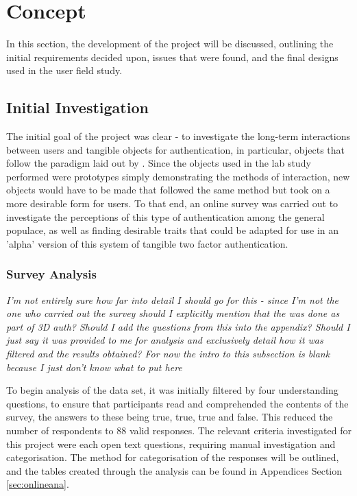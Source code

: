 \documentclass{l4proj}
\begin{document}
\chapter{Concept}

In this section, the development of the project will be discussed, outlining the initial requirements decided upon, issues that were found, and the final designs used in the user field study.

\section{Initial Investigation}

The initial goal of the project was clear - to investigate the long-term interactions between users and tangible objects for authentication, in particular, objects that follow the paradigm laid out by \cite{marky20203d}. Since the objects used in the lab study performed were prototypes simply demonstrating the methods of interaction, new objects would have to be made that followed the same method but took on a more desirable form for users. To that end, an online survey was carried out to investigate the perceptions of this type of authentication among the general populace, as well as finding desirable traits that could be adapted for use in an 'alpha' version of this system of tangible two factor authentication.

\subsection{Survey Analysis}

\textit{I'm not entirely sure how far into detail I should go for this - since I'm not the one who carried out the survey should I explicitly mention that the was done as part of 3D auth? Should I add the questions from this into the appendix? Should I just say it was provided to me for analysis and exclusively detail how it was filtered and the results obtained? For now the intro to this subsection is blank because I just don't know what to put here}

To begin analysis of the data set, it was initially filtered by four understanding questions, to ensure that participants read and comprehended the contents of the survey, the answers to these being true, true, true and false. This reduced the number of respondents to 88 valid responses. The relevant criteria investigated for this project were each open text questions, requiring manual investigation and categorisation. The method for categorisation of the responses will be outlined, and the tables created through the analysis can be found in Appendices Section \ref{sec:onlineana}.
\end{document}
